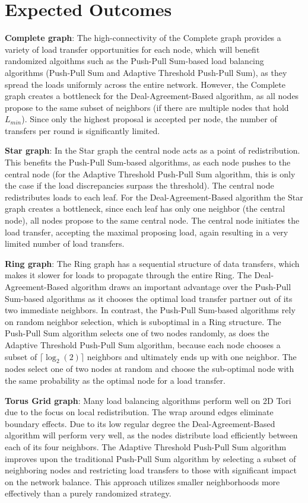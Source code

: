 \section{Expected Outcomes}\label{sec:expectedoutcome}
\textbf{Complete graph}: The high-connectivity of the Complete graph provides a variety of load transfer opportunities for each node, which will benefit randomized algoithms such as the Push-Pull Sum-based load balancing algorithms (Push-Pull Sum and Adaptive Threshold Push-Pull Sum), as they spread the loads uniformly across the entire network. However, the Complete graph creates a bottleneck for the Deal-Agreement-Based algorithm, as all nodes propose to the same subset of neighbors (if there are multiple nodes that hold $L_{min}$). Since only the highest proposal is accepted per node, the number of transfers per round is significantly limited.

\textbf{Star graph}: In the Star graph the central node acts as a point of redistribution. This benefits the Push-Pull Sum-based algorithms, as each node pushes to the central node (for the Adaptive Threshold Push-Pull Sum algorithm, this is only the case if the load discrepancies surpass the threshold). The central node redistributes loads to each leaf. For the Deal-Agreement-Based algorithm the Star graph creates a bottleneck, since each leaf has only one neighbor (the central node), all nodes propose to the same central node. The central node initiates the load transfer, accepting the maximal proposing load, again resulting in a very limited number of load transfers.

\textbf{Ring graph}: The Ring graph has a sequential structure of data transfers, which makes it slower for loads to propagate through the entire Ring. The Deal-Agreement-Based algorithm draws an important advantage over the Push-Pull Sum-based algorithms as it chooses the optimal load transfer partner out of its two immediate neighbors. In contrast, the Push-Pull Sum-based algorithms rely on random neighbor selection, which is suboptimal in a Ring structure. The Push-Pull Sum algorithm selects one of two nodes randomly, as does the Adaptive Threshold Push-Pull Sum algorithm, because each node chooses a subset of $\lceil \log_{2}{(2)} \rceil$ neighbors and ultimately ends up with one neighbor. The nodes select one of two nodes at random and choose the sub-optimal node with the same probability as the optimal node for a load transfer.

\textbf{Torus Grid graph}: Many load balancing algorithms perform well on 2D Tori due to the focus on local redistribution. The wrap around edges eliminate boundary effects. Due to its low regular degree the Deal-Agreement-Based algorithm will perform very well, as the nodes distribute load efficiently between each of its four neighbors. The Adaptive Threshold Push-Pull Sum algorithm improves upon the traditional Push-Pull Sum algorithm by selecting a subset of neighboring nodes and restricting load transfers to those with significant impact on the network balance. This approach utilizes smaller neighborhoods more effectively than a purely randomized strategy.

